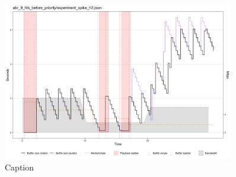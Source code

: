 \begin{figure}[h]
    \centering
    \includegraphics[width=0.9\textwidth]{res/eval_abr_spike_hls.png}
    \caption{Caption}
    \label{fig:eval_abr_hls}
\end{figure}


